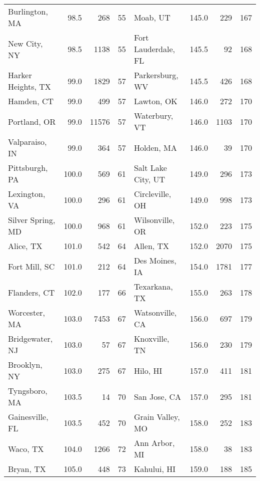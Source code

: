 \begin{longtable}{lrrr|lrrr}
Burlington, MA       &    98.5 &    268 &    55 & Moab, UT             &   145.0 &    229 &   167 \\
New City, NY         &    98.5 &   1138 &    55 & Fort Lauderdale, FL  &   145.5 &     92 &   168 \\
Harker Heights, TX   &    99.0 &   1829 &    57 & Parkersburg, WV      &   145.5 &    426 &   168 \\
Hamden, CT           &    99.0 &    499 &    57 & Lawton, OK           &   146.0 &    272 &   170 \\
Portland, OR         &    99.0 &  11576 &    57 & Waterbury, VT        &   146.0 &   1103 &   170 \\
Valparaiso, IN       &    99.0 &    364 &    57 & Holden, MA           &   146.0 &     39 &   170 \\
Pittsburgh, PA       &   100.0 &    569 &    61 & Salt Lake City, UT   &   149.0 &    296 &   173 \\
Lexington, VA        &   100.0 &    296 &    61 & Circleville, OH      &   149.0 &    998 &   173 \\
Silver Spring, MD    &   100.0 &    968 &    61 & Wilsonville, OR      &   152.0 &    223 &   175 \\
Alice, TX            &   101.0 &    542 &    64 & Allen, TX            &   152.0 &   2070 &   175 \\
Fort Mill, SC        &   101.0 &    212 &    64 & Des Moines, IA       &   154.0 &   1781 &   177 \\
Flanders, CT         &   102.0 &    177 &    66 & Texarkana, TX        &   155.0 &    263 &   178 \\
Worcester, MA        &   103.0 &   7453 &    67 & Watsonville, CA      &   156.0 &    697 &   179 \\
Bridgewater, NJ      &   103.0 &     57 &    67 & Knoxville, TN        &   156.0 &    230 &   179 \\
Brooklyn, NY         &   103.0 &    275 &    67 & Hilo, HI             &   157.0 &    411 &   181 \\
Tyngsboro, MA        &   103.5 &     14 &    70 & San Jose, CA         &   157.0 &    295 &   181 \\
Gainesville, FL      &   103.5 &    452 &    70 & Grain Valley, MO     &   158.0 &    252 &   183 \\
Waco, TX             &   104.0 &   1266 &    72 & Ann Arbor, MI        &   158.0 &     38 &   183 \\
Bryan, TX            &   105.0 &    448 &    73 & Kahului, HI          &   159.0 &    188 &   185 \\

\end{longtable}
